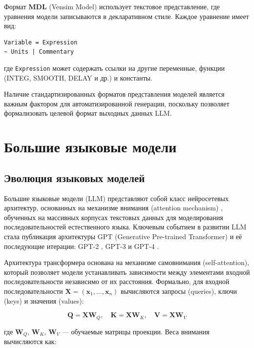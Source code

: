 Формат \textbf{MDL} (Vensim Model) использует текстовое представление, где уравнения модели записываются в декларативном стиле. Каждое уравнение имеет вид:

\begin{lstlisting}[language={}, caption={Пример записи уравнения в формате MDL}]
Variable = Expression
~ Units | Commentary
\end{lstlisting}

где \texttt{Expression} может содержать ссылки на другие переменные, функции (INTEG, SMOOTH, DELAY и др.) и константы.

Наличие стандартизированных форматов представления моделей является важным фактором для автоматизированной генерации, поскольку позволяет формализовать целевой формат выходных данных LLM.


\section{Большие языковые модели}

\subsection{Эволюция языковых моделей}

Большие языковые модели (LLM) представляют собой класс нейросетевых архитектур, основанных на механизме внимания (attention mechanism) \cite{vaswani2017attention}, обученных на массивных корпусах текстовых данных для моделирования последовательностей естественного языка. Ключевым событием в развитии LLM стала публикация архитектуры GPT (Generative Pre-trained Transformer) \cite{radford2018gpt} и её последующие итерации: GPT-2 \cite{radford2019gpt2}, GPT-3 \cite{brown2020gpt3} и GPT-4 \cite{openai2023gpt4}.

Архитектура трансформера основана на механизме самовнимания (self-attention), который позволяет модели устанавливать зависимости между элементами входной последовательности независимо от их расстояния. Формально, для входной последовательности $\mathbf{X} = (\mathbf{x}_1, \ldots, \mathbf{x}_n)$ вычисляются запросы (queries), ключи (keys) и значения (values):

\begin{equation}
    \mathbf{Q} = \mathbf{X}\mathbf{W}_Q, \quad \mathbf{K} = \mathbf{X}\mathbf{W}_K, \quad \mathbf{V} = \mathbf{X}\mathbf{W}_V
\end{equation}

где $\mathbf{W}_Q$, $\mathbf{W}_K$, $\mathbf{W}_V$ --- обучаемые матрицы проекции. Веса внимания вычисляются как:

